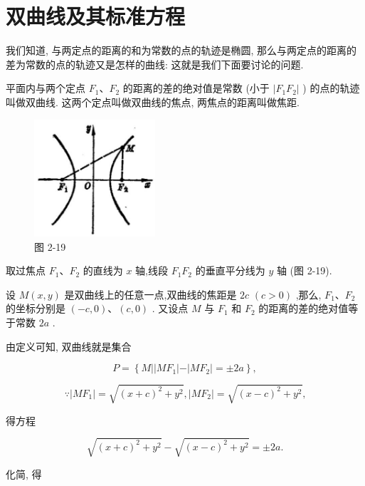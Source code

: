 \documentclass[lang=cn,newtx,10pt,scheme=chinese]{elegantbook}
\begin{document}
\section{双曲线及其标准方程}

我们知道, 与两定点的距离的和为常数的点的轨迹是椭圆, 那么与两定点的距离的差为常数的点的轨迹又是怎样的曲线: 这就是我们下面要讨论的问题.

平面内与两个定点 \({F}_{1}\text{、}{F}_{2}\) 的距离的差的绝对值是常数 (小于 \(\left| {{F}_{1}{F}_{2}}\right|\) ) 的点的轨迹叫做双曲线. 这两个定点叫做双曲线的焦点, 两焦点的距离叫做焦距.

\begin{figure}[h]
  \centering
  \includegraphics[max width=0.4\textwidth]{images/01912cc2-ffb6-728e-9ae7-b113ff05c64b_97_983208.jpg}
  \caption{图 2-19}
\end{figure}



取过焦点 \({F}_{1}\text{、}{F}_{2}\) 的直线为 \(x\) 轴,线段 \({F}_{1}{F}_{2}\) 的垂直平分线为 \(y\) 轴 (图 2-19).

设 \(M\left( {x,y}\right)\) 是双曲线上的任意一点,双曲线的焦距是 \({2c}\) \(\left( {c > 0}\right)\) ,那么, \({F}_{1}\text{、}{F}_{2}\) 的坐标分别是 \(\left( {-c,0}\right) \text{、}\left( {c,0}\right)\) . 又设点 \(M\) 与 \({F}_{1}\) 和 \({F}_{2}\) 的距离的差的绝对值等于常数 \({2a}\) .

由定义可知, 双曲线就是集合

\[
  P = \left\{ {M\left| \right| M{F}_{1}\left| -\right| M{F}_{2} \mid = \pm {2a}}\right\} ,
\]

\[
  \because \left| {M{F}_{1}}\right| = \sqrt{{\left( x + c\right) }^{2} + {y}^{2}},\left| {M{F}_{2}}\right| = \sqrt{{\left( x - c\right) }^{2} + {y}^{2}}\text{,}
\]

得方程

\[
  \sqrt{{\left( x + c\right) }^{2} + {y}^{2}} - \sqrt{{\left( x - c\right) }^{2} + {y}^{2}} = \pm {2a}.
\]

化简, 得
\end{document}
